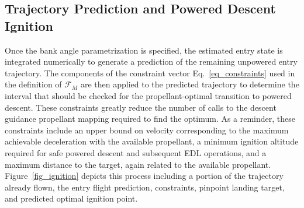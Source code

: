 \subsection{Trajectory Prediction and Powered Descent Ignition}
Once the bank angle parametrization is specified, the estimated entry state is integrated numerically to generate a prediction of the remaining unpowered entry trajectory. The components of the constraint vector Eq.~\ref{eq_constraints} used in the definition of $\mathcal{F}_M$ are then applied to the predicted trajectory to determine the interval that should be checked for the propellant-optimal transition to powered descent. These constraints greatly reduce the number of calls to the descent guidance propellant mapping required to find the optimum. As a reminder, these constraints include an upper bound on velocity corresponding to the maximum achievable deceleration with the available propellant, a minimum ignition altitude required for safe powered descent and subsequent EDL operations, and a maximum distance to the target, again related to the available propellant. Figure~\ref{fig_ignition} depicts this process including a portion of the trajectory already flown, the entry flight prediction, constraints, pinpoint landing target, and predicted optimal ignition point. 

